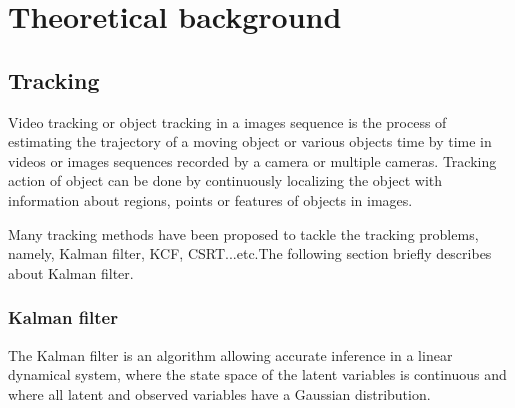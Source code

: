 \chapter{Theoretical background}

\section{Tracking}
\hspace{0.5cm}Video tracking or object tracking in a images sequence is the process of estimating the trajectory of a moving object or various objects time by time in videos or images sequences recorded by a camera or multiple cameras. Tracking action of object can be done by continuously localizing the object with information about regions, points or features of objects in images.\par
Many tracking methods have been proposed to tackle the tracking problems, namely, Kalman filter, KCF, CSRT...etc.The following
section briefly describes about Kalman filter.
\subsection{Kalman filter}
\hspace{0.5cm}The Kalman filter is an algorithm allowing accurate inference in a linear dynamical system, where the state space of the latent variables is continuous and where all latent and observed variables have a Gaussian distribution.\cite{Kalman}

